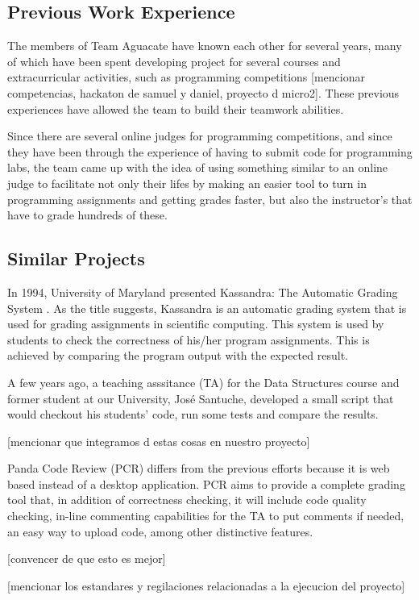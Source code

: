 
\subsection{Previous Work Experience}
The members of Team Aguacate have known each other for several years, many of which have been spent developing project for several courses and extracurricular activities, such as programming competitions [mencionar competencias, hackaton de samuel y daniel, proyecto d micro2]. These previous experiences have allowed the team to build their teamwork abilities.

Since there are several online judges for programming competitions, and since they have been through the experience of having to submit code for programming labs, the team came up with the idea of using something similar to an online judge to facilitate not only their lifes by making an easier tool to turn in programming assignments and getting grades faster, but also the instructor's that have to grade hundreds of these.

\subsection{Similar Projects}

In 1994, University of Maryland presented Kassandra: The Automatic Grading System \cite{Matt1994}. As the title suggests, Kassandra is an automatic grading system that is used for grading assignments in scientific computing. This system is used by students to check the correctness of his/her program assignments. This is achieved by comparing the program output with the expected result.

A few years ago, a teaching asssitance (TA) for the Data Structures course and former student at our University, José Santuche, developed a small script that would checkout his students' code, run some tests and compare the results.

[mencionar que integramos d estas cosas en nuestro proyecto]

Panda Code Review (PCR) differs from the previous efforts because it is web based instead of a desktop application. PCR aims to provide a complete grading tool that, in addition of correctness checking, it will include code quality checking, in-line commenting capabilities for the TA to put comments if needed, an easy way to upload code, among other distinctive features.

[convencer de que esto es mejor]

[mencionar los estandares y regilaciones relacionadas a la ejecucion del proyecto]